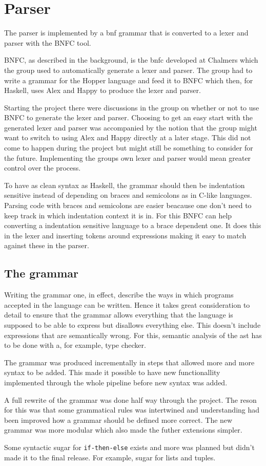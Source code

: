 \section{Parser}


The parser is implemented by a \gls{bnf} grammar that is converted to a lexer and 
parser with the BNFC tool. 

BNFC, as described in the background, is the \Gls{bnfc} developed at Chalmers which the group used to automatically generate a lexer and parser. The group had to write a grammar for the Hopper language and feed it to BNFC which then, for Haskell, uses Alex\cite{alex} and Happy\cite{happy} to produce the lexer and parser.

Starting the project there were discussions in the group on whether or not to use BNFC to generate the lexer and parser. Choosing to get an easy start with the generated lexer and parser was accompanied by the notion that the group might want to switch to using Alex and Happy directly at a later stage. This did not come to happen during the project but might still be something to consider for the future. Implementing the groups own lexer and parser would mean greater control over the process.

To have as clean syntax as Haskell, the grammar should then be indentation sensitive instead of depending on braces and semicolons as in C-like languages. Parsing code with braces and semicolons are easier beacause one don't need to keep track in which indentation context it is in. For this BNFC can help converting a indentation sensitive language to a brace dependent one. It does this in the lexer and inserting tokens around expressions making it easy to match against these in the parser.

\subsection{The grammar}

Writing the grammar one, in effect, describe the ways in which programs accepted in the language can be written. Hence it takes great consideration to detail to ensure that the grammar allows everything that the language is supposed to be able to express but disallows everything else. This doesn't include expressions that are semantically wrong. For this, semantic analysis of the \gls{ast} has to be done with a, for example, type checker. 

The grammar was produced incrementally in steps that allowed more and more syntax to be added. This made it possible to have new functionallity implemented through the whole pipeline before new syntax was added. 

A full rewrite of the grammar was done half way through the project. The reson for this was that some grammatical rules was intertwined and understanding had been improved how a grammar should be defined more correct. The new grammar was more modular which also made the futher extensions simpler.

Some syntactic sugar for \texttt{if-then-else} exists and more was planned but didn't made it to the final release. For example, sugar for lists and tuples.
